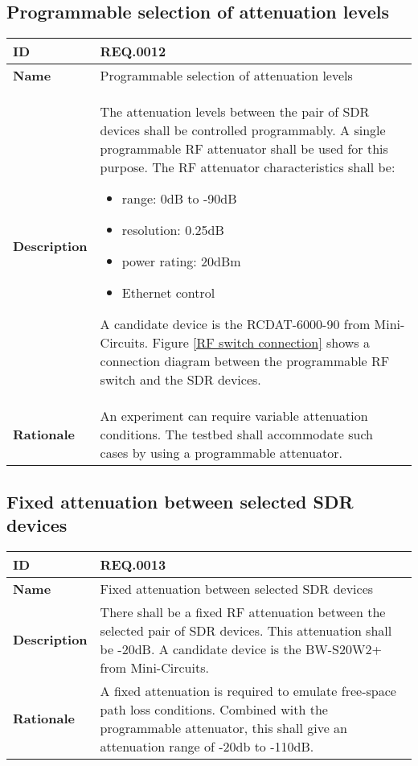 \documentclass[english,titlepage,a4paper]{report}
\newcommand{\requirement}[5]{
  \subsection{#2}
  #5

  \noindent
  \begin{tabular}{|l|p{9cm}|}
    \hline
    \textbf{ID} & #1 \\
    \hline
    \textbf{Name} & #2 \\
    \hline
    \textbf{Description} & #3 \\
    \hline
    \textbf{Rationale} & #4 \\
    \hline
  \end{tabular}
}
\begin{document}
\requirement{REQ.0012}{Programmable selection of attenuation levels}{
  The attenuation levels between the pair of \acrshort{SDR} devices shall be controlled programmably.
  A single programmable \acrshort{RF} attenuator shall be used for this purpose.
  The \acrshort{RF} attenuator characteristics shall be:
  \begin{itemize}
  \item range: 0dB to -90dB
  \item resolution: 0.25dB
  \item power rating: 20dBm
  \item \gls{Ethernet} control
  \end{itemize}
  A candidate device is the \gls{RCDAT-6000-90} from Mini-Circuits.
  Figure \ref{RF switch connection} shows a connection diagram between the programmable RF switch and the SDR devices.
}{
  An \gls{experiment} can require variable attenuation conditions.
  The testbed shall accommodate such cases by using a programmable attenuator.
}{}
\requirement{REQ.0013}{Fixed attenuation between selected SDR devices}{
  There shall be a fixed \acrshort{RF} attenuation between the selected pair of \acrshort{SDR} devices.
  This attenuation shall be -20dB.
  A candidate device is the \gls{BW-S20W2+} from Mini-Circuits.
}{
  A fixed attenuation is required to emulate free-space path loss conditions.
  Combined with the programmable attenuator, this shall give an attenuation range of -20db to -110dB.
}{}
\end{document}
